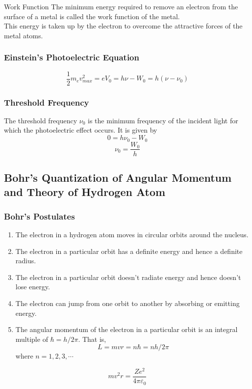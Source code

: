 \documentclass[12pt]{article}
\numberwithin{equation}{subsection}
\begin{document}
\begin{definition}{Work Function}{}
    The minimum energy required to remove an electron from the surface of a metal is called the work function of the metal. \\
    This energy is taken up by the electron to overcome the attractive forces of the metal atoms.
\end{definition}

\subsubsection{Einstein's Photoelectric Equation}
\begin{equation}
    \boxed{ \frac{1}{2}m_ev_{max}^2 = eV_0 = h\nu - W_0 = h(\nu - \nu_0) }
\end{equation}

\subsubsection{Threshold Frequency}
The threshold frequency $\nu_0$ is the minimum frequency of the incident light for which the photoelectric effect occurs. It is given by \[
    0 = h\nu_0 - W_0
\]
\begin{equation}
    \boxed{ \nu_0 = \frac{W_0}{h} }
\end{equation}

\subsection{Bohr's Quantization of Angular Momentum and Theory of Hydrogen Atom}
\subsubsection{Bohr's Postulates}
\begin{enumerate}
    \item The electron in a hydrogen atom moves in circular orbits around the nucleus.
    \item The electron in a particular orbit has a definite energy and hence a definite radius.
    \item The electron in a particular orbit doesn't radiate energy and hence doesn't lose energy.
    \item The electron can jump from one orbit to another by absorbing or emitting energy.
    \item The angular momentum of the electron in a particular orbit is an integral multiple of $\hbar = h/2\pi$. That is,
        \begin{equation}
            L = mvr = n\hbar = nh/2\pi
        \end{equation}
    where $n = 1, 2, 3, \cdots$
\end{enumerate}
\begin{equation}
    mv^2r = \frac{Ze^2}{4\pi\varepsilon_0}
\end{equation}
\end{document}

